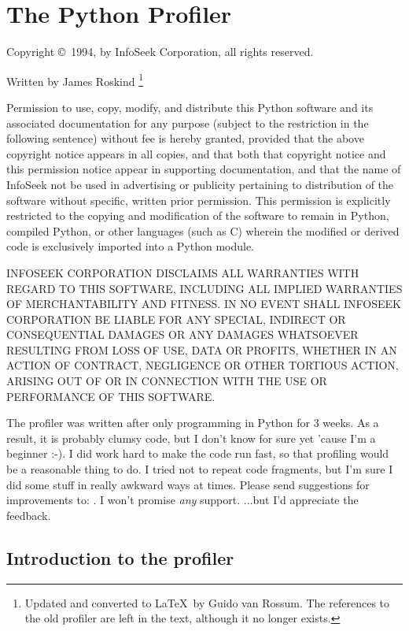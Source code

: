 \chapter{The Python Profiler}

Copyright \copyright\ 1994, by InfoSeek Corporation, all rights reserved.

Written by James Roskind%
\footnote{
Updated and converted to \LaTeX\ by Guido van Rossum.  The references to
the old profiler are left in the text, although it no longer exists.
}

Permission to use, copy, modify, and distribute this Python software
and its associated documentation for any purpose (subject to the
restriction in the following sentence) without fee is hereby granted,
provided that the above copyright notice appears in all copies, and
that both that copyright notice and this permission notice appear in
supporting documentation, and that the name of InfoSeek not be used in
advertising or publicity pertaining to distribution of the software
without specific, written prior permission.  This permission is
explicitly restricted to the copying and modification of the software
to remain in Python, compiled Python, or other languages (such as C)
wherein the modified or derived code is exclusively imported into a
Python module.

INFOSEEK CORPORATION DISCLAIMS ALL WARRANTIES WITH REGARD TO THIS
SOFTWARE, INCLUDING ALL IMPLIED WARRANTIES OF MERCHANTABILITY AND
FITNESS. IN NO EVENT SHALL INFOSEEK CORPORATION BE LIABLE FOR ANY
SPECIAL, INDIRECT OR CONSEQUENTIAL DAMAGES OR ANY DAMAGES WHATSOEVER
RESULTING FROM LOSS OF USE, DATA OR PROFITS, WHETHER IN AN ACTION OF
CONTRACT, NEGLIGENCE OR OTHER TORTIOUS ACTION, ARISING OUT OF OR IN
CONNECTION WITH THE USE OR PERFORMANCE OF THIS SOFTWARE.


The profiler was written after only programming in Python for 3 weeks.
As a result, it is probably clumsy code, but I don't know for sure yet
'cause I'm a beginner :-).  I did work hard to make the code run fast,
so that profiling would be a reasonable thing to do.  I tried not to
repeat code fragments, but I'm sure I did some stuff in really awkward
ways at times.  Please send suggestions for improvements to:
.  I won't promise \emph{any} support.  ...but
I'd appreciate the feedback.


\section{Introduction to the profiler}

